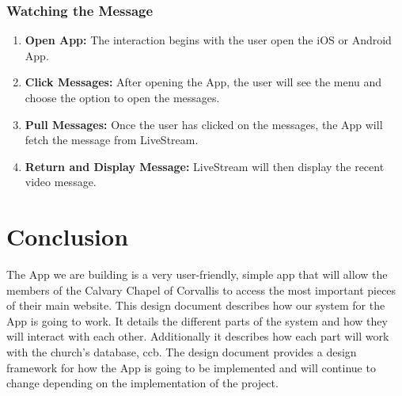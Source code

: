 \documentclass[letterpaper,10pt,draftclsnofoot,onecolumn,titlepage]{IEEEtran}
\begin{document}
			\subsubsection{Watching the Message}
				\begin{enumerate}
					\item \textbf{Open \Gls{App}:} The interaction begins with the user open the \gls{iOS} or \gls{Android} \gls{App}.
					\item \textbf{Click Messages:} After opening the \gls{App}, the user will see the menu and choose the option to open the messages.
					\item \textbf{Pull Messages:} Once the user has clicked on the messages, the \gls{App} will fetch the message from LiveStream.
					\item \textbf{Return and Display Message:} LiveStream will then display the recent video message.
				\end{enumerate}




	\section{Conclusion}
		The \gls{App} we are building is a very user-friendly, simple app that will allow the members of the Calvary Chapel of Corvallis to access the most important pieces of their main website.
		This design document describes how our system for the \gls{App} is going to work.
		It details the different parts of the system and how they will interact with each other.
		Additionally it describes how each part will work with the church's database, \gls{ccb}.
		The design document provides a design framework for how the \gls{App} is going to be implemented and will continue to change depending on the implementation of the project.
\end{document}
